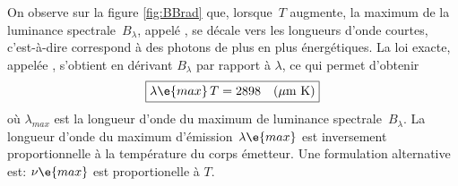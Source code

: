 \sk
On observe sur la figure \ref{fig:BBrad} que, lorsque~$T$ augmente, la maximum de la luminance spectrale~$B_\lambda$, appelé , se décale vers les longueurs d'onde courtes, c'est-à-dire correspond à des photons de plus en plus énergétiques. La loi exacte, appelée , s'obtient en dérivant $B_\lambda$ par rapport à $\lambda$, ce qui permet d'obtenir $$ \boxed{ \lambda\e{max} \, T = 2898 \quad (\mu\textrm{m~K}) } $$ où $\lambda_{max}$ est la longueur d'onde du maximum de luminance spectrale~$B_\lambda$. La longueur d'onde du maximum d'émission~$\lambda\e{max}$ est inversement proportionnelle à la température du corps émetteur. Une formulation alternative est: $\nu\e{max}$ est proportionelle à $T$.


